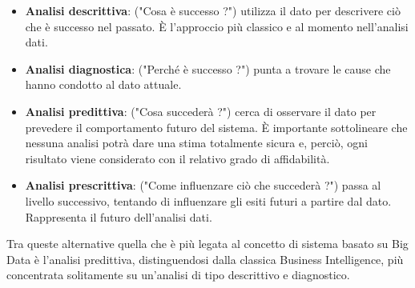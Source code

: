 \begin{itemize}	
	\item \textbf{Analisi descrittiva}: ("Cosa è successo ?") utilizza il dato per descrivere ciò che è successo nel passato. È l'approccio più classico e al momento nell'analisi dati.
	
	\item \textbf{Analisi diagnostica}: ("Perché è successo ?") punta a trovare le cause che hanno condotto al dato attuale.
	
	\item \textbf{Analisi predittiva}: ("Cosa succederà ?") cerca di osservare il dato per prevedere il comportamento futuro del sistema. È importante sottolineare che nessuna analisi potrà dare una stima totalmente sicura e, perciò, ogni risultato viene considerato con il relativo grado di affidabilità. 
	
	\item \textbf{Analisi prescrittiva}: ("Come influenzare ciò che succederà ?") passa al livello successivo, tentando di influenzare gli esiti futuri a partire dal dato. Rappresenta il futuro dell'analisi dati. 
	
\end{itemize}
Tra queste alternative quella che è più legata al concetto di sistema basato su Big Data è l'analisi predittiva, distinguendosi dalla classica Business Intelligence, più concentrata solitamente su un'analisi di tipo descrittivo e diagnostico.